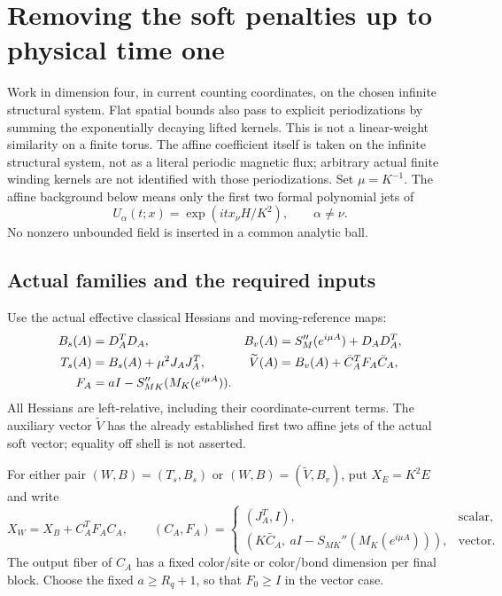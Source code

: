 \section{Removing the soft penalties up to physical time one}
\label{spb-section}

Work in dimension four, in current counting coordinates, on the chosen
infinite structural system. Flat spatial bounds also pass to explicit periodizations by summing the exponentially decaying lifted kernels. This is not a linear-weight similarity on a finite torus. The affine coefficient itself is taken on the infinite structural system, not as a literal periodic magnetic flux; arbitrary actual finite winding kernels are not identified with those periodizations.
Set $\mu=K^{-1}$. The affine background below means only the first
two formal polynomial jets of
\[
 U_\alpha(t;x)=\exp(i t x_\nu H/K^2),\qquad \alpha\ne\nu.
\]
No nonzero unbounded field is inserted in a common analytic ball.

\subsection{Actual families and the required inputs}
\label{spb-inputs}

Use the actual effective classical Hessians and moving-reference maps:
\begin{align}
 B_s(A)&=D_A^TD_A,&
 B_v(A)&=S_M''(e^{i\mu A})+D_AD_A^T,\notag\\
 T_s(A)&=B_s(A)+\mu^2J_AJ_A^T,&
 \widetilde V(A)&=B_v(A)+\bar C_A^TF_A\bar C_A,\notag\\
 F_A&=aI-S_{MK}''(M_K(e^{i\mu A})).
 \label{spb-families}
\end{align}
All Hessians are left-relative, including their coordinate-current
terms. The auxiliary vector $\widetilde V$ has the already established
first two affine jets of the actual soft vector; equality off shell
is not asserted.

For either pair $(W,B)=(T_s,B_s)$ or
$(W,B)=(\widetilde V,B_v)$, put $X_E=K^2E$ and write
\begin{equation}
 X_W=X_B+C_A^TF_AC_A,
 \qquad
 (C_A,F_A)=
 \begin{cases}
 (J_A^T,I),&\text{scalar},\\
 (K\bar C_A,\ aI-S_{MK}''(M_K(e^{i\mu A}))),&\text{vector}.
 \end{cases}
 \label{spb-coarse-factor}
\end{equation}
The output fiber of $C_A$ has a fixed color/site or color/bond
dimension per final block. Choose the fixed $a\ge R_q+1$, so that
$F_0\ge I$ in the vector case.

